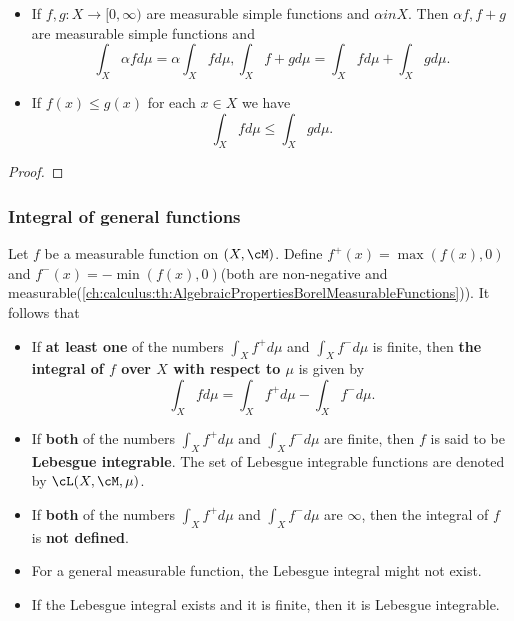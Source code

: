 \begin{refsection}
\begin{theorem}\cite[374]{johnsonbaugh2010foundations}\hfill
	\begin{itemize}
		\item If $f,g: X\to [0,\infty)$ are measurable simple functions and $\alpha in X$. Then $\alpha f, f+g$ are measurable simple functions and 
		$$\int_X \alpha f d\mu = \alpha \int_X f d\mu, \int_X  f+g d\mu = \int_X f d\mu + \int_X g d\mu.$$ 	
		\item If $f(x) \leq g(x)$ for each $x\in X$ we have $$\int_X fd\mu \leq \int_X g d\mu.$$
	\end{itemize}		
\end{theorem}
\begin{proof}

\end{proof}


\subsubsection{Integral of general functions}

\begin{definition}\cite[369]{johnsonbaugh2010foundations}
Let $f$ be a measurable function on $(X,\cM)$. Define	$f^+(x) = \max(f(x),0)$ and $f^-(x) = -\min(f(x),0)$(both are non-negative and measurable(\autoref{ch:calculus:th:AlgebraicPropertiesBorelMeasurableFunctions})). It follows that
\begin{itemize}
	\item If \textbf{at least one} of the numbers $\int_X f^+ d\mu$ and $\int_X f^- d\mu$ is finite, then \textbf{the integral of $f$ over $X$ with respect to $\mu$} is given by
	$$\int_X fd\mu = \int_X f^+ d\mu - \int_X f^- d\mu.$$
	\item If \textbf{both} of the numbers $\int_X f^+ d\mu$ and $\int_X f^- d\mu$ are finite, then $f$ is said to be \textbf{Lebesgue integrable}. The set of Lebesgue integrable functions are denoted by $\cL(X,\cM,\mu)$. 
	\item If \textbf{both} of the numbers $\int_X f^+ d\mu$ and $\int_X f^- d\mu$ are $\infty$, then the integral of $f$ is \textbf{ not defined}.
\end{itemize}
\end{definition}



\begin{note}\hfill
\begin{itemize}
	\item For a general measurable function, the Lebesgue integral might not exist.
	\item If the Lebesgue integral exists and it is finite, then it is Lebesgue integrable.
\end{itemize}	
\end{note}







\end{refsection}
